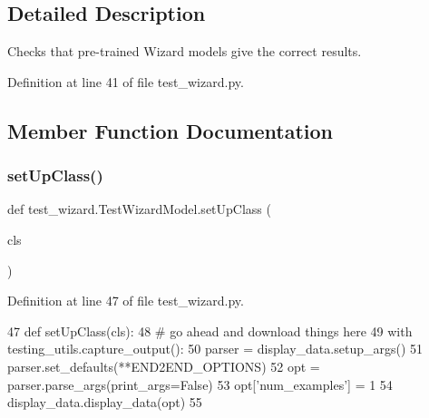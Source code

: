 \subsection{Detailed Description}
\begin{DoxyVerb}Checks that pre-trained Wizard models give the correct results.
\end{DoxyVerb}
 

Definition at line 41 of file test\+\_\+wizard.\+py.



\subsection{Member Function Documentation}
\mbox{\label{classtest__wizard_1_1TestWizardModel_a2b3661d3b4129ecb38ac3c5fe47232e1}} 
\subsubsection{\texorpdfstring{set\+Up\+Class()}{setUpClass()}}
{\footnotesize\ttfamily def test\+\_\+wizard.\+Test\+Wizard\+Model.\+set\+Up\+Class (\begin{DoxyParamCaption}\item[{}]{cls }\end{DoxyParamCaption})}



Definition at line 47 of file test\+\_\+wizard.\+py.


\begin{DoxyCode}
47     \textcolor{keyword}{def }setUpClass(cls):
48         \textcolor{comment}{# go ahead and download things here}
49         with testing\_utils.capture\_output():
50             parser = display\_data.setup\_args()
51             parser.set\_defaults(**END2END\_OPTIONS)
52             opt = parser.parse\_args(print\_args=\textcolor{keyword}{False})
53             opt[\textcolor{stringliteral}{'num\_examples'}] = 1
54             display\_data.display\_data(opt)
55 
\end{DoxyCode}
\mbox{\label{classtest__wizard_1_1TestWizardModel_a25fdc3cdc736bc273eaeed0019dfaf5b}} 

